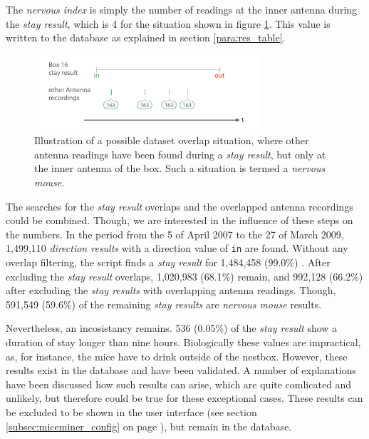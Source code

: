 The \textit{nervous index} is simply the number of readings at the inner antenna during the \textit{stay result}, which is 4 for the situation shown in figure \ref{fig:dataset_overlap_nervous}. This value is written to the database as explained in section \ref{para:res_table}.

\begin{figure}[htpb]
\begin{center}
  \includegraphics[width=0.75\textwidth]{assets/pdf/dataset_overlap_nervous_schema.pdf}
  \caption[Dataset overlap illustration]{Illustration of a possible dataset overlap situation, where other antenna readings have been found during a \textit{stay result}, but only at the inner antenna of the box. Such a situation is termed a \textit{nervous mouse}.}
  \label{fig:dataset_overlap_nervous}
\end{center}
\end{figure}

The searches for the \textit{stay result} overlaps and the overlapped antenna recordings could be combined. Though, we are interested in the influence of these steps on the numbers. In the period from the 5 of April 2007 to the 27 of March 2009, 1,499,110 \textit{direction results} with a direction value of \lstinline|in| are found. Without any overlap filtering, the script finds a \textit{stay result} for 1,484,458 (99.0\%) . After excluding the \textit{stay result} overlaps, 1,020,983 (68.1\%) remain, and 992,128 (66.2\%) after excluding the \textit{stay results} with overlapping antenna readings. Though, 591,549 (59.6\%) of the remaining \textit{stay results} are \textit{nervous mouse} results.

Nevertheless, an incosistancy remains. 536 (0.05\%) of the \textit{stay result} show a duration of stay longer than nine hours. Biologically these values are impractical, as, for instance, the mice have to drink outside of the nestbox. However, these results exist in the database and have been validated. A number of explanations have been discussed how such results can arise, which are quite comlicated and unlikely, but therefore could be true for these exceptional cases. These results can be excluded to be shown in the user interface (see section \ref{subsec:miceminer_config} on page \pageref{subsec:miceminer_config}), but remain in the database.     

